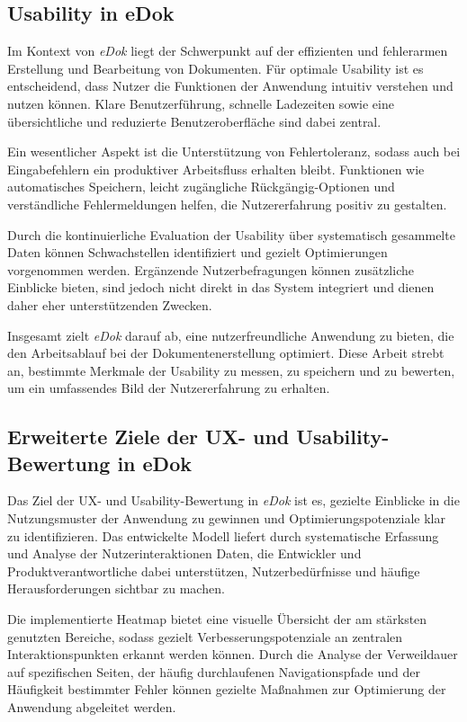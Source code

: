 \documentclass[12pt,oneside]{article}
\begin{document}
\subsection{Usability in eDok}

Im Kontext von \textit{eDok} liegt der Schwerpunkt auf der effizienten und fehlerarmen Erstellung und Bearbeitung von Dokumenten. Für optimale Usability ist es entscheidend, dass Nutzer die Funktionen der Anwendung intuitiv verstehen und nutzen können. Klare Benutzerführung, schnelle Ladezeiten sowie eine übersichtliche und reduzierte Benutzeroberfläche sind dabei zentral.

Ein wesentlicher Aspekt ist die Unterstützung von Fehlertoleranz, sodass auch bei Eingabefehlern ein produktiver Arbeitsfluss erhalten bleibt. Funktionen wie automatisches Speichern, leicht zugängliche Rückgängig-Optionen und verständliche Fehlermeldungen helfen, die Nutzererfahrung positiv zu gestalten.

Durch die kontinuierliche Evaluation der Usability über systematisch gesammelte Daten können Schwachstellen identifiziert und gezielt Optimierungen vorgenommen werden. Ergänzende Nutzerbefragungen können zusätzliche Einblicke bieten, sind jedoch nicht direkt in das System integriert und dienen daher eher unterstützenden Zwecken.

Insgesamt zielt \textit{eDok} darauf ab, eine nutzerfreundliche Anwendung zu bieten, die den Arbeitsablauf bei der Dokumentenerstellung optimiert. Diese Arbeit strebt an, bestimmte Merkmale der Usability zu messen, zu speichern und zu bewerten, um ein umfassendes Bild der Nutzererfahrung zu erhalten.

\subsection{Erweiterte Ziele der UX- und Usability-Bewertung in eDok}

Das Ziel der UX- und Usability-Bewertung in \textit{eDok} ist es, gezielte Einblicke in die Nutzungsmuster der Anwendung zu gewinnen und Optimierungspotenziale klar zu identifizieren. Das entwickelte Modell liefert durch systematische Erfassung und Analyse der Nutzerinteraktionen Daten, die Entwickler und Produktverantwortliche dabei unterstützen, Nutzerbedürfnisse und häufige Herausforderungen sichtbar zu machen.

Die implementierte Heatmap bietet eine visuelle Übersicht der am stärksten genutzten Bereiche, sodass gezielt Verbesserungspotenziale an zentralen Interaktionspunkten erkannt werden können. Durch die Analyse der Verweildauer auf spezifischen Seiten, der häufig durchlaufenen Navigationspfade und der Häufigkeit bestimmter Fehler können gezielte Maßnahmen zur Optimierung der Anwendung abgeleitet werden.
\end{document}
